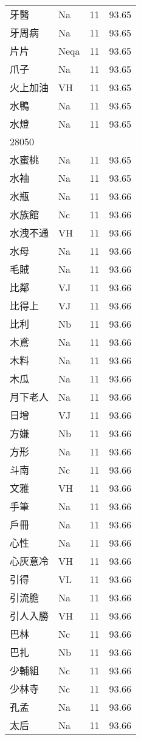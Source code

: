 \documentclass[twocolumn]{book}
\begin{document}
\begin{supertabular}{llrr}
牙醫 & Na & 11 &  93.65\\
牙周病 & Na & 11 &  93.65\\
片片 & Neqa & 11 &  93.65\\
爪子 & Na & 11 &  93.65\\
火上加油 & VH & 11 &  93.65\\
水鴨 & Na & 11 &  93.65\\
水燈 & Na & 11 &  93.65\\
28050\\
水蜜桃 & Na & 11 &  93.65\\
水袖 & Na & 11 &  93.65\\
水瓶 & Na & 11 &  93.66\\
水族館 & Nc & 11 &  93.66\\
水洩不通 & VH & 11 &  93.66\\
水母 & Na & 11 &  93.66\\
毛賊 & Na & 11 &  93.66\\
比鄰 & VJ & 11 &  93.66\\
比得上 & VJ & 11 &  93.66\\
比利 & Nb & 11 &  93.66\\
木鳶 & Na & 11 &  93.66\\
木料 & Na & 11 &  93.66\\
木瓜 & Na & 11 &  93.66\\
月下老人 & Na & 11 &  93.66\\
日增 & VJ & 11 &  93.66\\
方嫌 & Nb & 11 &  93.66\\
方形 & Na & 11 &  93.66\\
斗南 & Nc & 11 &  93.66\\
文雅 & VH & 11 &  93.66\\
手筆 & Na & 11 &  93.66\\
戶冊 & Na & 11 &  93.66\\
心性 & Na & 11 &  93.66\\
心灰意冷 & VH & 11 &  93.66\\
引得 & VL & 11 &  93.66\\
引流膽 & Na & 11 &  93.66\\
引人入勝 & VH & 11 &  93.66\\
巴林 & Nc & 11 &  93.66\\
巴扎 & Nb & 11 &  93.66\\
少輔組 & Nc & 11 &  93.66\\
少林寺 & Nc & 11 &  93.66\\
孔孟 & Na & 11 &  93.66\\
太后 & Na & 11 &  93.66\\

\end{supertabular}
\end{document}
